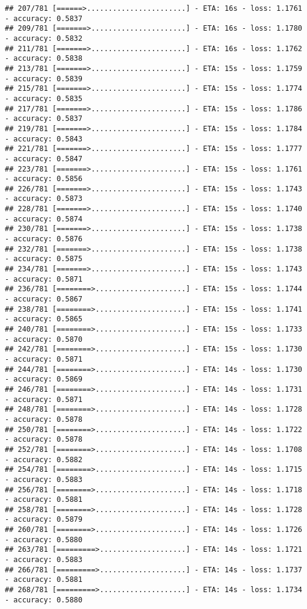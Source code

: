 \documentclass[
]{article}
\begin{document}
\begin{verbatim}
## 207/781 [======>.......................] - ETA: 16s - loss: 1.1761 - accuracy: 0.5837
## 209/781 [=======>......................] - ETA: 16s - loss: 1.1780 - accuracy: 0.5832
## 211/781 [=======>......................] - ETA: 16s - loss: 1.1762 - accuracy: 0.5838
## 213/781 [=======>......................] - ETA: 15s - loss: 1.1759 - accuracy: 0.5839
## 215/781 [=======>......................] - ETA: 15s - loss: 1.1774 - accuracy: 0.5835
## 217/781 [=======>......................] - ETA: 15s - loss: 1.1786 - accuracy: 0.5837
## 219/781 [=======>......................] - ETA: 15s - loss: 1.1784 - accuracy: 0.5843
## 221/781 [=======>......................] - ETA: 15s - loss: 1.1777 - accuracy: 0.5847
## 223/781 [=======>......................] - ETA: 15s - loss: 1.1761 - accuracy: 0.5856
## 226/781 [=======>......................] - ETA: 15s - loss: 1.1743 - accuracy: 0.5873
## 228/781 [=======>......................] - ETA: 15s - loss: 1.1740 - accuracy: 0.5874
## 230/781 [=======>......................] - ETA: 15s - loss: 1.1738 - accuracy: 0.5876
## 232/781 [=======>......................] - ETA: 15s - loss: 1.1738 - accuracy: 0.5875
## 234/781 [=======>......................] - ETA: 15s - loss: 1.1743 - accuracy: 0.5871
## 236/781 [========>.....................] - ETA: 15s - loss: 1.1744 - accuracy: 0.5867
## 238/781 [========>.....................] - ETA: 15s - loss: 1.1741 - accuracy: 0.5865
## 240/781 [========>.....................] - ETA: 15s - loss: 1.1733 - accuracy: 0.5870
## 242/781 [========>.....................] - ETA: 15s - loss: 1.1730 - accuracy: 0.5871
## 244/781 [========>.....................] - ETA: 14s - loss: 1.1730 - accuracy: 0.5869
## 246/781 [========>.....................] - ETA: 14s - loss: 1.1731 - accuracy: 0.5871
## 248/781 [========>.....................] - ETA: 14s - loss: 1.1728 - accuracy: 0.5878
## 250/781 [========>.....................] - ETA: 14s - loss: 1.1722 - accuracy: 0.5878
## 252/781 [========>.....................] - ETA: 14s - loss: 1.1708 - accuracy: 0.5882
## 254/781 [========>.....................] - ETA: 14s - loss: 1.1715 - accuracy: 0.5883
## 256/781 [========>.....................] - ETA: 14s - loss: 1.1718 - accuracy: 0.5881
## 258/781 [========>.....................] - ETA: 14s - loss: 1.1728 - accuracy: 0.5879
## 260/781 [========>.....................] - ETA: 14s - loss: 1.1726 - accuracy: 0.5880
## 263/781 [=========>....................] - ETA: 14s - loss: 1.1721 - accuracy: 0.5883
## 266/781 [=========>....................] - ETA: 14s - loss: 1.1737 - accuracy: 0.5881
## 268/781 [=========>....................] - ETA: 14s - loss: 1.1734 - accuracy: 0.5880

\end{verbatim}
\end{document}
